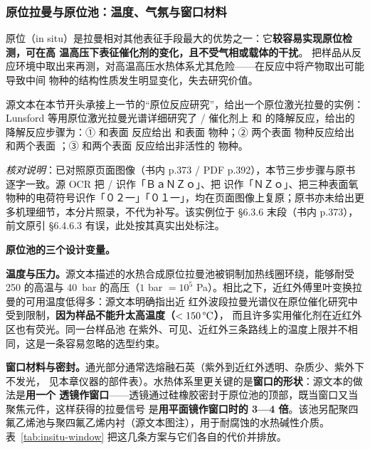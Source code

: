 \subsubsection{原位拉曼与原位池：温度、气氛与窗口材料}
\label{sec:ch06b-insitu}

原位（in situ）是拉曼相对其他表征手段最大的优势之一：它\textbf{较容易实现原位检测，可在高
温高压下表征催化剂的变化，且不受气相或载体的干扰}。
把样品从反应环境中取出来再测，对高温高压水热体系尤其危险——在反应中将产物取出可能导致中间
物种的结构性质发生明显变化，失去研究价值。

源文本在本节开头承接上一节的“原位反应研究”，给出一个原位激光拉曼的实例：Lunsford 等用原位激光拉曼光谱详细研究了 / 催化剂上  和  的降解反应，给出的  降解反应步骤为：①  和表面  反应给出  和表面  物种；② 两个表面  物种反应给出  和两个表面 ；③  和两个表面  反应给出非活性的  物种。

\emph{核对说明}：已对照原页面图像（书内 p.373 / PDF p.392），本节三步步骤与原书逐字一致。源 OCR 把 / 识作「ＢａＮＺｏ」、把  识作「ＮＺｏ」、把三种表面氧物种的电荷符号识作「０２一」「０１一」，均在页面图像上复原；原书亦未给出更多机理细节，本分片照录，不代为补写。该实例位于 §6.3.6 末段（书内 p.373），前文原引 §6.4.6.3 有误，此处按其真实出处标注。

\textbf{原位池的三个设计变量。}

\textbf{温度与压力。}源文本描述的水热合成原位拉曼池被铜制加热线圈环绕，能够耐受
\qty{250}{\degC} 的高温与 \qty{40}{bar} 的高压（$1$ bar $=10^5$ Pa）。相比之下，近红外傅里叶变换拉曼的可用温度低得多：源文本明确指出近
红外波段拉曼光谱仪在原位催化研究中受到限制，\textbf{因为样品不能升太高温度（$<\qty{150}{\degC}$）}，
而且许多实用催化剂在近红外区也有荧光。同一台样品池
在紫外、可见、近红外三条路线上的温度上限并不相同，这是一条容易忽略的选型约束。

\textbf{窗口材料与密封。}通光部分通常选熔融石英（紫外到近红外透明、杂质少、紫外下不发光，
见本章仪器的部件表）。水热体系里更关键的是\textbf{窗口的形状}：源文本的做法是\textbf{用一个
透镜作窗口}——透镜通过硅橡胶密封于原位池的顶部，既当窗口又当聚焦元件，这样获得的拉曼信号
是\textbf{用平面镜作窗口时的 3—4 倍}。该池另配聚四
氟乙烯池与聚四氟乙烯内衬（源文本图注），用于耐腐蚀的水热碱性介质。表~\ref{tab:insitu-window}
把这几条方案与它们各自的代价并排放。


